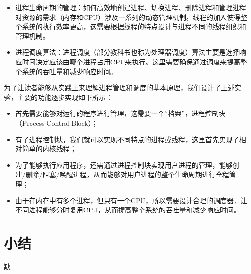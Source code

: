 \begin{itemize}
\item
  进程生命周期的管理：如何高效地创建进程、切换进程、删除进程和管理进程对资源的需求（内存和CPU）涉及一系列的动态管理机制。线程的加入使得整个系统的执行效率更高，这需要根据线程的特点设计与进程不同的线程组织和管理机制。
\item
  进程调度算法：进程调度（部分教科书也称为处理器调度）算法主要是选择响应时间决定应该由哪个进程占用CPU来执行。这里需要确保通过调度来提高整个系统的吞吐量和减少响应时间。
\end{itemize}

为了让读者能够从实践上来理解进程管理和调度的基本原理，我们设计了上述实验，主要的功能逐步实现如下所示：

\begin{itemize}
\item
  首先需要能够对运行的程序进行管理，这需要一个``档案''，进程控制块（Process
  Control Block）；
\item
  有了进程控制块，我们就可以实现不同特点的进程或线程，这里首先实现了相对简单的内核线程；
\item
  为了能够执行应用程序，还需通过进程控制块实现用户进程的管理，能够创建/删除/阻塞/唤醒进程，从而能够对用户进程的整个生命周期进行全程管理；
\item
  由于在内存中有多个进程，但只有一个CPU，所以需要设计合理的调度器，让不同进程能够分时复用CPU，从而提高整个系统的吞吐量和减少响应时间。
\end{itemize}


%
%
%
%
%
%
%

\section{小结}
缺